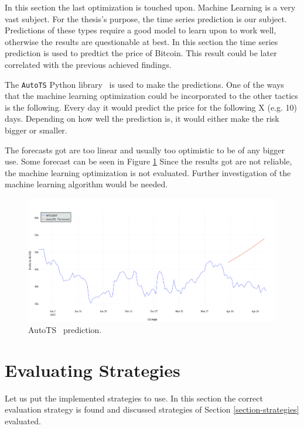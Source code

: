 In this section the last optimization is touched upon. Machine Learning is a very vast subject. For the thesis's purpose, the time series prediction is our subject. Predictions of these types require a good model to learn upon to work well, otherwise the results are questionable at best. In this section the time series prediction is used to predtict the price of Bitcoin. This result could be later correlated with the previous achieved findings.

The \texttt{AutoTS} Python library~\cite{autots} is used to make the predictions. One of the ways that the machine learning optimization could be incorporated to the other tactics is the following. Every day it would predict the price for the following X (e.g. 10) days. Depending on how well the prediction is, it would either make the risk bigger or smaller.

The forecasts got are too linear and usually too optimistic to be of any bigger use. Some forecast can be seen in Figure \ref{figure-autots-prediction}
Since the results got are not reliable, the machine learning optimization is not evaluated. Further investigation of the machine learning algorithm would be needed.

\begin{figure}[!hbt]
    \centering
    \includegraphics[width=\columnwidth]{figures/autots-prediction.png}
    \caption{AutoTS~\cite{autots} prediction.}
    \label{figure-autots-prediction}
\end{figure}

\section{Evaluating Strategies}
Let us put the implemented strategies to use. In this section the correct evaluation strategy is found and discussed strategies of Section \ref{section-strategies} evaluated.

